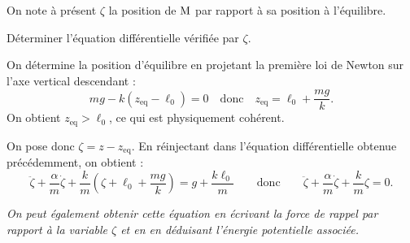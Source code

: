 


\begin{enonce}
On note à présent $\zeta$ la position de $\ptM$ par rapport à sa position à l'équilibre. 

Déterminer l'équation différentielle vérifiée par $\zeta$.

\end{enonce}



\begin{corrigeNewpage}
On détermine la position d'équilibre en projetant la première loi de Newton sur l'axe vertical descendant : \vspace{-1mm}
\[
mg-k(z_{\textrm{eq}}-\ell_0) = 0 \quad\text{donc}\quad z_{\textrm{eq}} = \ell_0+\frac{mg}{k}.
\]
On obtient $z_{\textrm{eq}}>\ell_0$, ce qui est physiquement cohérent.

On pose donc $\zeta = z-z_{\textrm{eq}}$. En réinjectant dans l'équation différentielle obtenue précédemment, on obtient :
\[
\ddot \zeta +\frac{\alpha}{m}\dot \zeta + \frac{k}{m}\left(\zeta+\ell_0+\frac{mg}{k}\right) = g+\frac{k \ell_0}{m} 
\qquad\text{donc}\qquad
\ddot \zeta +\frac{\alpha}{m}\dot \zeta + \frac{k}{m}\zeta = 0.
\]

{\itshape On peut également obtenir cette équation en écrivant la force de rappel par rapport à la variable $\zeta$ et en en déduisant l'énergie potentielle associée.}
\end{corrigeNewpage}


\finEntrainement




\newpage





